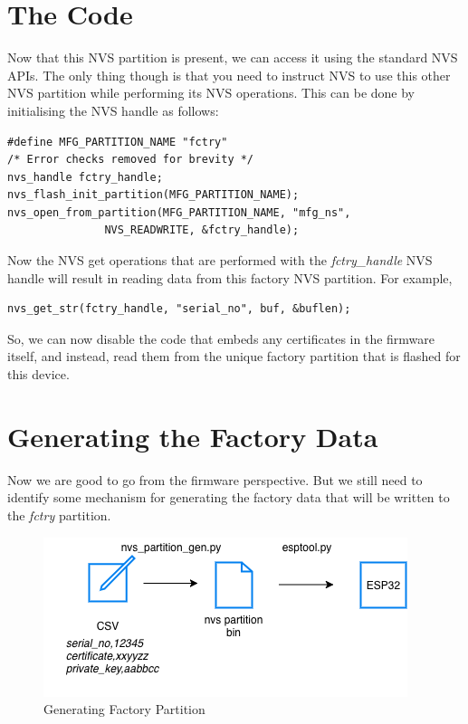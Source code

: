 \documentclass[main.tex]{subfiles}
\begin{document}
\section{The Code}
Now that this NVS partition is present, we can access it using the standard NVS APIs. The only thing though is that you need to instruct NVS to use this other NVS partition while performing its NVS operations. This can be done by initialising the NVS handle as follows:

\begin{verbatim}
#define MFG_PARTITION_NAME "fctry"
/* Error checks removed for brevity */
nvs_handle fctry_handle;
nvs_flash_init_partition(MFG_PARTITION_NAME);
nvs_open_from_partition(MFG_PARTITION_NAME, "mfg_ns",
               NVS_READWRITE, &fctry_handle);
\end{verbatim}

Now the NVS get operations that are performed with the \textit{fctry\_handle} NVS handle will result in reading data from this factory NVS partition. For example,

\begin{verbatim}
nvs_get_str(fctry_handle, "serial_no", buf, &buflen);
\end{verbatim}

So, we can now disable the code that embeds any certificates in the firmware itself, and instead, read them from the unique factory partition that is flashed for this device.

\section{Generating the Factory Data}\label{sec:gen_factory_data}
Now we are good to go from the firmware perspective. But we still need to identify some mechanism for generating the factory data that will be written to the \textit{fctry} partition.

\begin{figure}
    \centering
    \includegraphics{../../_static/generate_factory_partition.png}
    \caption{Generating Factory Partition}
    \label{fig:gen_fac_part}
\end{figure}
\end{document}
